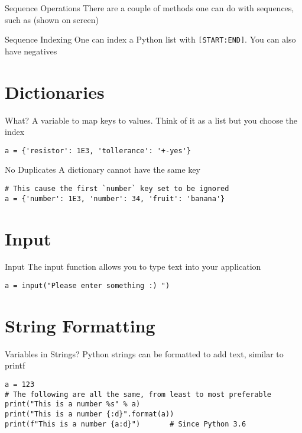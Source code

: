 \begin{frame}[containsverbatim]{Sequence Operations}
    There are a couple of methods one can do with sequences, such as (shown on screen)
\end{frame}

\begin{frame}[containsverbatim]{Sequence Indexing}
    One can index a Python list with \texttt{[START:END]}. You can also have negatives
\end{frame}

\section{Dictionaries}

\begin{frame}[containsverbatim]{What?}
    A variable to map keys to values. Think of it as a list but you choose the index
    \begin{verbatim}
a = {'resistor': 1E3, 'tollerance': '+-yes'}
    \end{verbatim}
\end{frame}

\begin{frame}[containsverbatim]{No Duplicates}
    A dictionary cannot have the same key
    \begin{verbatim}
# This cause the first `number` key set to be ignored
a = {'number': 1E3, 'number': 34, 'fruit': 'banana'}
    \end{verbatim}
\end{frame}

\section{Input}

\begin{frame}[containsverbatim]{Input}
    The input function allows you to type text into your application
    \begin{verbatim}
a = input("Please enter something :) ")
    \end{verbatim}
\end{frame}

\section{String Formatting}
\begin{frame}[containsverbatim]{Variables in Strings?}
    Python strings can be formatted to add text, similar to printf
    \begin{verbatim}
a = 123
# The following are all the same, from least to most preferable
print("This is a number %s" % a)
print("This is a number {:d}".format(a))
print(f"This is a number {a:d}")       # Since Python 3.6
    \end{verbatim}
\end{frame}

